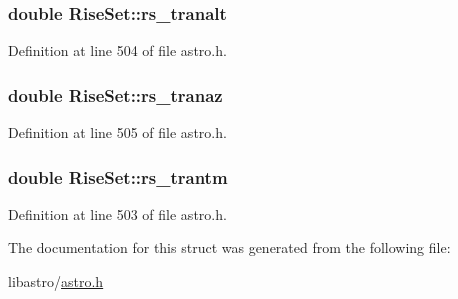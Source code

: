 \hypertarget{struct_rise_set_a59bfd7c06bdb640a9b1d15ef3351e8e0}{
\subsubsection[{rs\-\_\-tranalt}]{\setlength{\rightskip}{0pt plus 5cm}double Rise\-Set\-::rs\-\_\-tranalt}}\label{struct_rise_set_a59bfd7c06bdb640a9b1d15ef3351e8e0}


Definition at line 504 of file astro.\-h.

\hypertarget{struct_rise_set_a8b1030e15f24d1125ebf411eb9257e66}{
\subsubsection[{rs\-\_\-tranaz}]{\setlength{\rightskip}{0pt plus 5cm}double Rise\-Set\-::rs\-\_\-tranaz}}\label{struct_rise_set_a8b1030e15f24d1125ebf411eb9257e66}


Definition at line 505 of file astro.\-h.

\hypertarget{struct_rise_set_a1cd5d4547fcea9ae11a8210ed9c39add}{
\subsubsection[{rs\-\_\-trantm}]{\setlength{\rightskip}{0pt plus 5cm}double Rise\-Set\-::rs\-\_\-trantm}}\label{struct_rise_set_a1cd5d4547fcea9ae11a8210ed9c39add}


Definition at line 503 of file astro.\-h.



The documentation for this struct was generated from the following file\-:\begin{DoxyCompactItemize}
\item 
libastro/\hyperlink{astro_8h}{astro.\-h}\end{DoxyCompactItemize}
